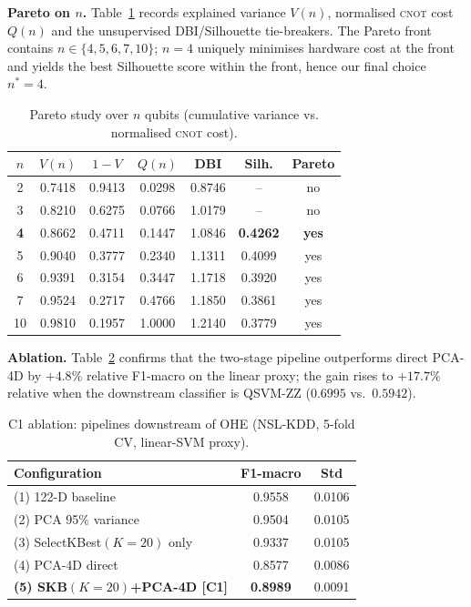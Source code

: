 \documentclass[journal]{IEEEtran}
\newcommand{\ZZ}{\textsc{ZZ}}
\newcommand{\QSVM}{QSVM-\ZZ}
\begin{document}
  \textbf{Pareto on $n$.} Table~\ref{tab:c1-pareto} records explained
  variance $V(n)$, normalised \textsc{cnot} cost $Q(n)$ and the
  unsupervised DBI/Silhouette tie-breakers. The Pareto front contains
  $n\in\{4,5,6,7,10\}$; $n{=}4$ uniquely minimises hardware cost at the
  front and yields the best Silhouette score within the front, hence
  our final choice $n^{*}{=}4$.

  \begin{table}[t]
  \centering
  \caption{Pareto study over $n$ qubits (cumulative variance vs.
    normalised \textsc{cnot} cost).}
  \label{tab:c1-pareto}
  \small
  \begin{tabular}{ccccccc}
  \toprule
  $n$ & $V(n)$ & $1-V$ & $Q(n)$ & DBI & Silh. & Pareto\\\midrule
  2  & 0.7418 & 0.9413 & 0.0298 & 0.8746 & --     & no\\
  3  & 0.8210 & 0.6275 & 0.0766 & 1.0179 & --     & no\\
  \textbf{4}  & 0.8662 & 0.4711 & 0.1447 & 1.0846 & \textbf{0.4262} & \textbf{yes}\\
  5  & 0.9040 & 0.3777 & 0.2340 & 1.1311 & 0.4099 & yes\\
  6  & 0.9391 & 0.3154 & 0.3447 & 1.1718 & 0.3920 & yes\\
  7  & 0.9524 & 0.2717 & 0.4766 & 1.1850 & 0.3861 & yes\\
  10 & 0.9810 & 0.1957 & 1.0000 & 1.2140 & 0.3779 & yes\\
  \bottomrule
  \end{tabular}
  \end{table}

  \textbf{Ablation.} Table~\ref{tab:c1-ablation} confirms that the
  two-stage pipeline outperforms direct PCA-4D by $+4.8\%$ relative
  F1-macro on the linear proxy; the gain rises to $+17.7\%$ relative
  when the downstream classifier is \QSVM{} ($0.6995$ vs.\ $0.5942$).

  \begin{table}[t]
  \centering
  \caption{C1 ablation: pipelines downstream of OHE
    (NSL-KDD, 5-fold CV, linear-SVM proxy).}
  \label{tab:c1-ablation}
  \small
  \begin{tabular}{lcc}
  \toprule
  Configuration & F1-macro & Std\\\midrule
  (1) 122-D baseline                    & 0.9558 & 0.0106\\
  (2) PCA 95\% variance                 & 0.9504 & 0.0105\\
  (3) SelectKBest$(K{=}20)$ only        & 0.9337 & 0.0105\\
  (4) PCA-4D direct                     & 0.8577 & 0.0086\\
  \textbf{(5) SKB$(K{=}20)$+PCA-4D [C1]} & \textbf{0.8989} & 0.0091\\
  \bottomrule
  \end{tabular}
  \end{table}
\end{document}
